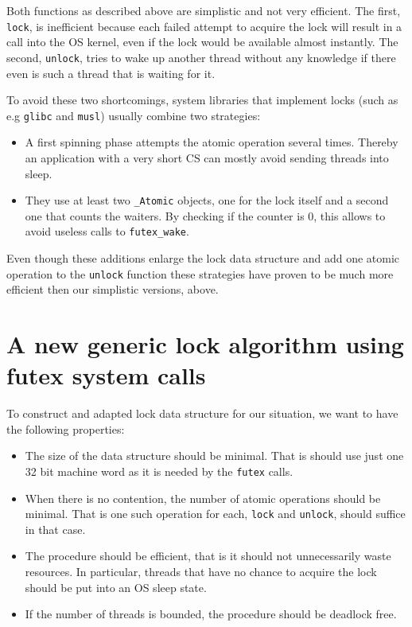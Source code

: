 \documentclass{sig-alternate-05-2015}
\begin{document}
Both functions as described above are simplistic and not very
efficient. The first, \texttt{lock}, is inefficient because each failed
attempt to acquire the lock will result in a call into the OS
kernel, even if the lock would be available almost instantly.  The
second, \texttt{unlock}, tries to wake up another thread without any
knowledge if there even is such a thread that is waiting for it.

To avoid these two shortcomings, system libraries that implement
locks (such as e.g \texttt{glibc} and \texttt{musl}) usually combine two
strategies:\vspace*{-2ex}

\begin{itemize}
\item A first spinning phase attempts the atomic operation several
times. Thereby an application with a very short CS can mostly
avoid sending threads into sleep.\vspace*{-2ex}

\item They use at least two \texttt{\_Atomic} objects, one for the lock itself
and a second one that counts the waiters. By checking if the
counter is 0, this allows to avoid useless calls to
\texttt{futex\_wake}.\vspace*{-2ex}
\end{itemize}

Even though these additions enlarge the lock data structure and add
one atomic operation to the \texttt{unlock} function these strategies have
proven to be much more efficient then our simplistic versions,
above.

\section{A new generic lock algorithm using futex system calls}
\label{sec-3}

To construct and adapted lock data structure for our situation, we
want to have the following properties:

\begin{itemize}
\item The size of the data structure should be minimal. That is should
use just one 32 bit machine word as it is needed by the \texttt{futex}
calls.\vspace*{-1ex}

\item When there is no contention, the number of atomic operations should
be minimal. That is one such operation for each, \texttt{lock} and
\texttt{unlock}, should suffice in that case.\vspace*{-1ex}

\item The procedure should be efficient, that is it should not
unnecessarily waste resources. In particular, threads that have no
chance to acquire the lock should be put into an OS sleep
state.\vspace*{-1ex}

\item If the number of threads is bounded, the procedure should be
deadlock free.\vspace*{-1ex}
\end{itemize}
\end{document}
